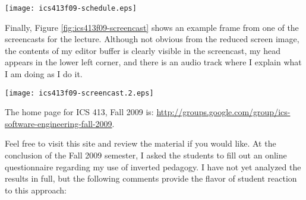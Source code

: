 \documentclass[11pt]{article}
\begin{document}
\begin{figure*}[ht]
  \center
  \texttt{[image: ics413f09-schedule.eps]}
  \caption{ICS 413, Fall 2009 Schedule Page}
  \label{fig:ics413f09-schedule}
\end{figure*}  


Finally, Figure \ref{fig:ics413f09-screencast} shows an example frame from
one of the screencasts for the lecture.  Although not obvious from the
reduced screen image, the contents of my editor buffer is clearly visible
in the screencast, my head appears in the lower left corner, and there is
an audio track where I explain what I am doing as I do it. 

\begin{figure*}[ht]
  \center
  \texttt{[image: ics413f09-screencast.2.eps]}
  \caption{ICS 413, Fall 2009 example screencast frame}
  \label{fig:ics413f09-screencast}
\end{figure*}  

The home page for ICS 413, Fall 2009 is: \newline
\url{http://groups.google.com/group/ics-software-engineering-fall-2009}.

Feel free to visit this site and review the material if you would
like.  At the conclusion of the Fall 2009 semester, I asked the students to fill
out an online questionnaire regarding my use of inverted pedagogy.  I have
not yet analyzed the results in full, but the following comments provide
the flavor of student reaction to this approach:
\end{document}
